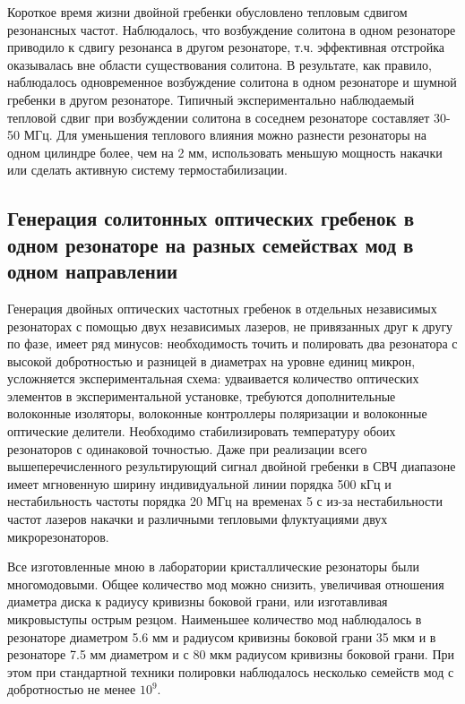 Короткое время жизни двойной гребенки обусловлено тепловым сдвигом резонансных частот. Наблюдалось, что возбуждение солитона в одном резонаторе приводило к сдвигу резонанса в другом резонаторе, т.ч. эффективная отстройка оказывалась вне области существования солитона. В результате, как правило, наблюдалось одновременное возбуждение солитона в одном резонаторе и шумной гребенки в другом резонаторе. Типичный экспериментально наблюдаемый тепловой сдвиг при возбуждении солитона в соседнем резонаторе составляет 30-50 МГц. Для уменьшения теплового влияния можно разнести резонаторы на одном цилиндре более, чем на 2 мм, использовать меньшую мощность накачки или сделать активную систему термостабилизации.

\subsection{Генерация солитонных оптических гребенок в одном резонаторе на разных семействах мод в одном направлении}

Генерация двойных оптических частотных гребенок в отдельных независимых резонаторах с помощью двух независимых лазеров, не привязанных друг к другу по фазе, имеет ряд минусов: необходимость точить и полировать два резонатора с высокой добротностью и разницей в диаметрах на уровне единиц микрон, усложняется экспериментальная схема: удваивается количество оптических элементов в экспериментальной установке, требуются дополнительные волоконные изоляторы, волоконные контроллеры поляризации и волоконные оптические делители. Необходимо стабилизировать температуру обоих резонаторов с одинаковой точностью. Даже при реализации всего вышеперечисленного результирующий сигнал двойной гребенки в СВЧ диапазоне имеет мгновенную ширину индивидуальной линии порядка 500 кГц и нестабильность частоты порядка 20 МГц на временах 5 с из-за нестабильности частот лазеров накачки и различными тепловыми флуктуациями двух микрорезонаторов.

Все изготовленные мною в лаборатории кристаллические резонаторы были многомодовыми. Общее количество мод можно снизить, увеличивая отношения диаметра диска к радиусу кривизны боковой грани, или изготавливая микровыступы острым резцом. Наименьшее количество мод наблюдалось в резонаторе диаметром 5.6 мм и радиусом кривизны боковой грани 35 мкм и в резонаторе 7.5 мм диаметром и с 80 мкм радиусом кривизны боковой грани. При этом при стандартной техники полировки наблюдалось несколько семейств мод с добротностью не менее $10^9$.

